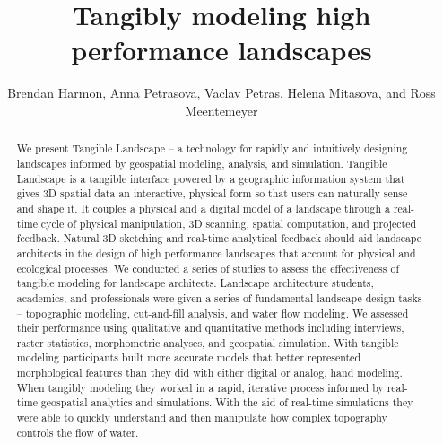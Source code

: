 \documentclass[Afour,sagev,times]{sagej} %
\begin{document}
\title{Tangibly modeling high performance landscapes}
\author{Brendan Harmon, Anna Petrasova, Vaclav Petras, Helena Mitasova, and Ross Meentemeyer}
\affiliation{\affilnum{1}Center for Geospatial Analytics, North Carolina State University, USA\\
\affilnum{2}Robert Reich School of Landscape Architecture, Louisiana State University, USA}


\begin{abstract}
We present Tangible Landscape 
-- a technology for rapidly and intuitively designing landscapes
informed by geospatial modeling, analysis, and simulation.
Tangible Landscape is a tangible interface 
powered by a geographic information system 
that gives 3D spatial data an interactive, physical form so that 
users can naturally sense and shape it.
It couples a physical and a digital model of a landscape
through a real-time cycle of 
physical manipulation, 3D scanning, 
spatial computation, and projected feedback.
Natural 3D sketching and real-time analytical feedback should aid
landscape architects in the design of 
high performance landscapes 
that account for physical and ecological processes. 
We conducted a series of studies to assess the effectiveness of 
tangible modeling for landscape architects.
Landscape architecture students, academics, and professionals 
were given a series of fundamental landscape design tasks 
-- topographic modeling, cut-and-fill analysis, and water flow modeling. 
We assessed their performance
using qualitative and quantitative methods 
including interviews, raster statistics, morphometric analyses, 
and geospatial simulation.
With tangible modeling participants
built more accurate models 
that better represented morphological features 
than they did with either digital or analog, hand modeling.
When tangibly modeling
they worked in a rapid, iterative process
informed by real-time geospatial analytics and simulations.  
With the aid of real-time simulations 
they were able to quickly understand and then manipulate
how complex topography controls the flow of water.
\end{abstract}
\end{document}
